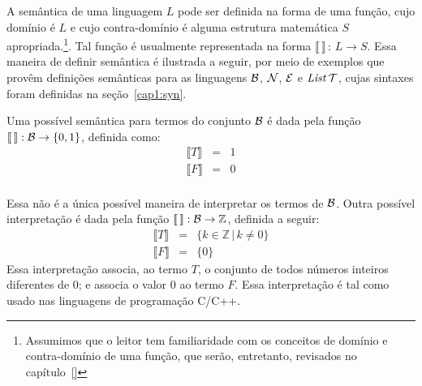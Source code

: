 A sem\^antica de uma linguagem $L$ pode ser definida na forma de uma função, cujo domínio é $L$ e cujo contra-domínio é alguma estrutura matemática $S$ apropriada.\footnote{Assumimos que o leitor tem familiaridade com os conceitos de dom\'inio e contra-dom\'inio de uma função, que serão, entretanto, revisados no cap\'itulo~\ref{}}.  Tal função é usualmente representada na forma $\llbracket\,\rrbracket\,:\,L \rightarrow S$. Essa maneira de definir semântica é ilustrada a seguir, por meio de exemplos que provêm definições semânticas para as linguagens $\mathcal{B}$, $\mathcal{N}$, $\mathcal{E}$ e $\textit{List\/}\,\mathcal{T}$, cujas sintaxes foram definidas na se\c{c}\~ao~\ref{cap1:syn}.

\begin{Definition}
Uma poss\'ivel sem\^antica para termos do conjunto $\mathcal{B}$ \'e dada pela fun\c{c}\~ao $\llbracket\,\rrbracket : \mathcal{B} \rightarrow \{0,1\}$, definida como:
\[
\begin{array}{lcl}
\llbracket T \rrbracket & = & 1\\
\llbracket F \rrbracket & = & 0\\
\end{array}
\]
\end{Definition}
Essa não é a \'unica poss\'ivel maneira de interpretar os termos de $\mathcal{B}$.
Outra poss\'ivel interpretação é dada pela função $\llbracket\,\rrbracket : \mathcal{B} \rightarrow \mathbb{Z}$, definida a seguir:
\[
\begin{array}{lcl}
\llbracket T \rrbracket & = & \{k\in\mathbb{Z}\,|\,k\neq 0\}\\
\llbracket F \rrbracket & = & \{0\}
\end{array}
\]
Essa interpretação associa, ao termo $T$, o conjunto de todos números inteiros diferentes de $0$; e associa o valor $0$ ao termo $F$. Essa interpretação é tal como usado nas linguagens de programa\c{c}\~ao C/C++.


